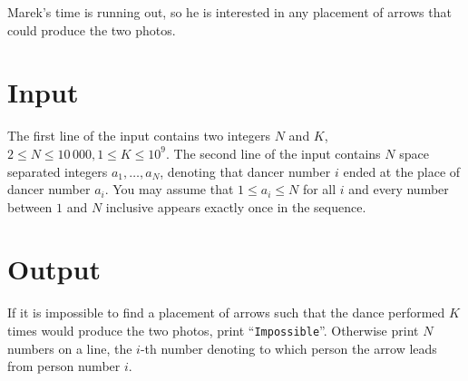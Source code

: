 Marek's time is running out, so he is interested in any placement of arrows that could produce the
two photos.

\section*{Input}
The first line of the input contains two integers $N$ and $K$, $2 \le N \le 10\,000, 1\le K \le
10^9$. The second line of the input contains $N$ space separated integers $a_1, \dots, a_N$,
denoting that dancer number $i$ ended at the place of dancer number $a_i$. You may assume that $1
\le a_i \le N$ for all $i$ and every number between $1$ and $N$ inclusive appears exactly once in
the sequence.

\section*{Output}
If it is impossible to find a placement of arrows such that the dance performed $K$ times would
produce the two photos, print ``{\tt Impossible}''.
Otherwise print $N$ numbers on a line, the $i$-th number denoting to which person the arrow leads
from person number $i$.%
